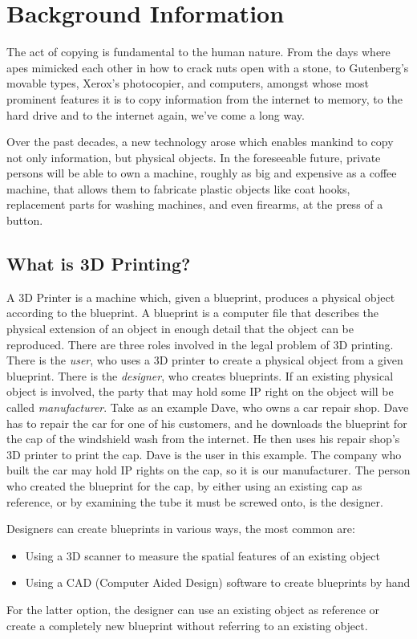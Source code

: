 \section{Background Information}

The act of copying is fundamental to the human nature.
From the days where apes mimicked each other in how to crack nuts open with a stone, to Gutenberg’s movable types, Xerox’s photocopier, and computers, amongst whose most prominent features it is to copy information from the internet to memory, to the hard drive and to the internet again, we’ve come a long way.

Over the past decades, a new technology arose which enables mankind to copy not only information, but physical objects.
In the foreseeable future, private persons will be able to own a machine, roughly as big and expensive as a coffee machine, that allows them to fabricate plastic objects like coat hooks, replacement parts for washing machines, and even firearms, at the press of a button.

\subsection{What is 3D Printing?}
A 3D Printer is a machine which, given a blueprint, produces a physical object according to the blueprint.
A blueprint is a computer file that describes the physical extension of an object in enough detail that the object can be reproduced.
There are three roles involved in the legal problem of 3D printing.
There is the \emph{user}, who uses a 3D printer to create a physical object from a given blueprint. There is the \emph{designer}, who creates blueprints.
If an existing physical object is involved, the party that may hold some IP right on the object will be called \emph{manufacturer}.
Take as an example Dave, who owns a car repair shop.
Dave has to repair the car for one of his customers, and he downloads the blueprint for the cap of the windshield wash from the internet.
He then uses his repair shop’s 3D printer to print the cap.
Dave is the user in this example.
The company who built the car may hold IP rights on the cap, so it is our manufacturer.
The person who created the blueprint for the cap, by either using an existing cap as reference, or by examining the tube it must be screwed onto, is the designer.

Designers can create blueprints in various ways, the most common are:
\begin{itemize}
  \item Using a 3D scanner to measure the spatial features of an existing object
  \item Using a CAD (Computer Aided Design) software to create blueprints by hand
\end{itemize}
For the latter option, the designer can use an existing object as reference or create a completely new blueprint without referring to an existing object.

